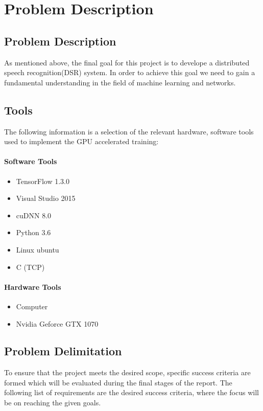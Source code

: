 \chapter{Problem Description}\label{ch:problem_description}

\section{Problem Description}

As mentioned above, the final goal for this project is to develope a distributed
speech recognition(DSR) system.
In order to achieve this goal we need to gain a fundamental understanding in the field of machine learning and networks.

\section{Tools}
The following information is a selection of the relevant hardware, software tools used to implement the GPU accelerated training:

\subsubsection{Software Tools}
\begin{itemize}
	\item TensorFlow 1.3.0
	\item Visual Studio 2015
	\item cuDNN 8.0
	\item Python 3.6
	\item Linux ubuntu
	\item C (TCP)
\end{itemize}

\subsubsection{Hardware Tools}
\begin{itemize}
	\item Computer
	\item Nvidia Geforce GTX 1070 
\end{itemize}




\section{Problem Delimitation}
To ensure that the project meets the desired scope,
specific success criteria are formed which will be
evaluated during the final stages of the report.
The following list of requirements are the desired
success criteria, where the focus will be on reaching
the given goals.

